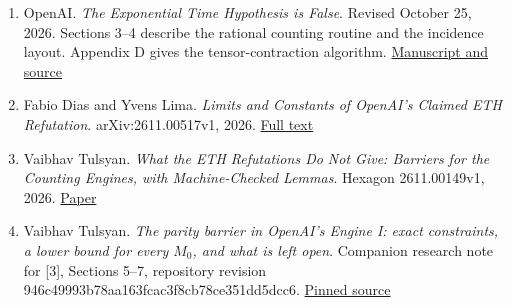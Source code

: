 \documentclass[
  10pt,
]{article}
\providecommand{\tightlist}{%
  \setlength{\itemsep}{0pt}\setlength{\parskip}{0pt}}
\begin{document}
\begin{enumerate}
\def\labelenumi{\arabic{enumi}.}
\tightlist
\item
  OpenAI. \emph{The Exponential Time Hypothesis is False}. Revised
  October 25, 2026. Sections 3--4 describe the rational counting routine
  and the incidence layout. Appendix D gives the tensor-contraction
  algorithm.
  \href{https://github.com/openai/math/tree/main/preprints/The-Exponential-Time-Hypothesis-is-False-October-25-2026}{Manuscript
  and source}
\item
  Fabio Dias and Yvens Lima. \emph{Limits and Constants of OpenAI's
  Claimed ETH Refutation}. arXiv:2611.00517v1, 2026.
  \href{https://arxiv.org/html/2611.00517v1}{Full text}
\item
  Vaibhav Tulsyan. \emph{What the ETH Refutations Do Not Give: Barriers
  for the Counting Engines, with Machine-Checked Lemmas}. Hexagon
  2611.00149v1, 2026.
  \href{https://hexagonmath.org/pdf/2611.00149v1}{Paper}
\item
  Vaibhav Tulsyan. \emph{The parity barrier in OpenAI's Engine I: exact
  constraints, a lower bound for every \(M_0\), and what is left open}.
  Companion research note for {[}3{]}, Sections 5--7, repository
  revision 946c49993b78aa163fcac3f8cb78ce351dd5dcc6.
  \href{https://github.com/xennygrimmato/eth-hamiltonicity/blob/946c49993b78aa163fcac3f8cb78ce351dd5dcc6/research/permanent/parity-barrier.md}{Pinned
  source}
\end{enumerate}
\end{document}
